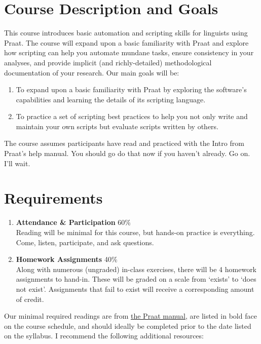 \documentclass [12pt]{article}
\begin{document}
\section*{Course Description and Goals}

This course introduces basic automation and scripting skills for linguists using Praat. The course will expand upon a basic familiarity with Praat and explore how scripting can help you automate mundane tasks, ensure consistency in your analyses, and provide implicit (and richly-detailed) methodological documentation of your research.  Our main goals will be:

     \begin{enumerate}
    \item To expand upon a basic familiarity with Praat by exploring the software's capabilities and learning the details of its scripting language.
    \item To practice a set of scripting best practices to help you not only write and maintain your own scripts but evaluate scripts written by others.
     \end{enumerate}

The course assumes participants have read and practiced with the Intro from Praat's help manual. You should go do that now if you haven't already.  Go on.  I'll wait.
    
 \section*{Requirements}
  \begin{enumerate}
       \item \textbf{Attendance \& Participation} \hfill{} 60\%\\
            Reading will be minimal for this course, but hands-on practice is everything. Come, listen, participate, and ask questions.
       \item \textbf{Homework Assignments} \hfill{} 40\%\\
	    Along with numerous (ungraded) in-class exercises, there will be 4 homework assignments to hand-in. These will be graded on a scale from `exists' to `does not exist'. Assignments that fail to exist will receive a corresponding amount of credit.
   \end{enumerate}

Our minimal required readings are from \underline{\href{http://www.fon.hum.uva.nl/praat/manual/Scripting.html}{the Praat manual}}, are listed in bold face on the course schedule, and should ideally be completed prior to the date listed on the syllabus.  I recommend the following additional resources:
\end{document}
